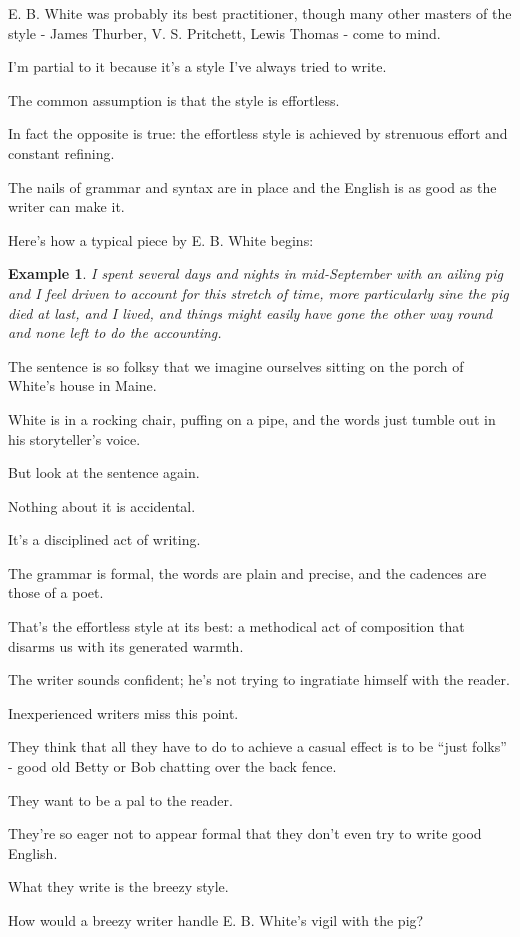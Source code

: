 \documentclass{book}
\numberwithin{equation}{section}
\newtheorem{example}{Example}[chapter]
\begin{document}
E. B. White was probably its best practitioner, though many other masters of the style - James Thurber, V. S. Pritchett, Lewis Thomas - come to mind.

I'm partial to it because it's a style I've always tried to write.

The common assumption is that the style is effortless.

In fact the opposite is true: the effortless style is achieved by strenuous effort and constant refining.

The nails of grammar and syntax are in place and the English is as good as the writer can make it.

Here's how a typical piece by E. B. White begins:
\begin{example}
    I spent several days and nights in mid-September with an ailing pig and I feel driven to account for this stretch of time, more particularly sine the pig died at last, and I lived, and things might easily have gone the other way round and none left to do the accounting.
\end{example}
The sentence is so folksy that we imagine ourselves sitting on the porch of White's house in Maine.

White is in a rocking chair, puffing on a pipe, and the words just tumble out in his storyteller's voice.

But look at the sentence again.

Nothing about it is accidental.

It's a disciplined act of writing.

The grammar is formal, the words are plain and precise, and the cadences are those of a poet.

That's the effortless style at its best: a methodical act of composition that disarms us with its generated warmth.

The writer sounds confident; he's not trying to ingratiate himself with the reader.

%
Inexperienced writers miss this point.

They think that all they have to do to achieve a casual effect is to be ``just folks'' - good old Betty or Bob chatting over the back fence.

They want to be a pal to the reader.

They're so eager not to appear formal that they don't even try to write good English.

What they write is the breezy style.

%
How would a breezy writer handle E. B. White's vigil with the pig?
\end{document}

